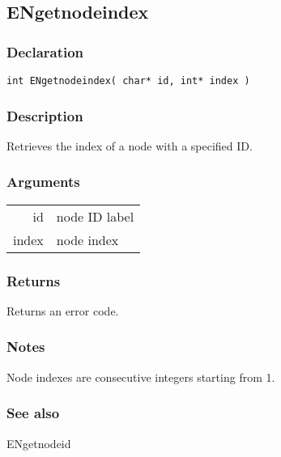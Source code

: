 \subsection{ENgetnodeindex}

\subsubsection{Declaration}
\begin{lstlisting}
int ENgetnodeindex( char* id, int* index )
\end{lstlisting}

\subsubsection{Description}
Retrieves the index of a node with a specified ID.
\subsubsection{Arguments}
\begin{tabular}{ r p{11cm} }
id& node ID label   \\[6pt]
index&node index   \\[6pt]
\end{tabular}

  
\subsubsection{Returns}
Returns an error code.



\subsubsection{Notes}
Node indexes are consecutive integers starting from 1.
 
\subsubsection{See also}
ENgetnodeid

